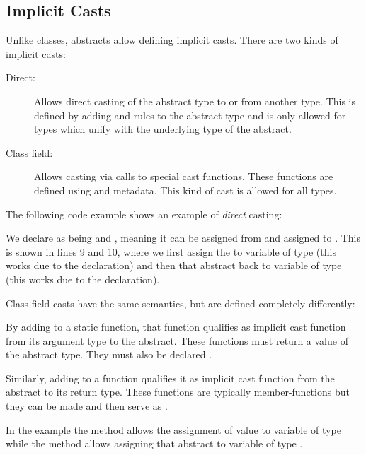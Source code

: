 \subsection{Implicit Casts}
\label{types-abstract-implicit-casts}

Unlike classes, abstracts allow defining implicit casts. There are two kinds of implicit casts:

\begin{description}
	\item[Direct:] Allows direct casting of the abstract type to or from another type. This is defined by adding  and  rules to the abstract type and is only allowed for types which unify with the underlying type of the abstract.
	\item[Class field:] Allows casting via calls to special cast functions. These functions are defined using  and  metadata. This kind of cast is allowed for all types.
\end{description}
The following code example shows an example of \emph{direct} casting:

We declare  as being  and , meaning it can be assigned from  and assigned to . This is shown in lines 9 and 10, where we first assign the   to variable  of type  (this works due to the  declaration) and then that abstract back to variable  of type  (this works due to the  declaration).

Class field casts have the same semantics, but are defined completely differently:

By adding  to a static function, that function qualifies as implicit cast function from its argument type to the abstract. These functions must return a value of the abstract type. They must also be declared .

Similarly, adding  to a function qualifies it as implicit cast function from the abstract to its return type. These functions are typically member-functions but they can be made  and then serve as .

In the example the method  allows the assignment of value  to variable  of type  while the method  allows assigning that abstract to variable  of type .

